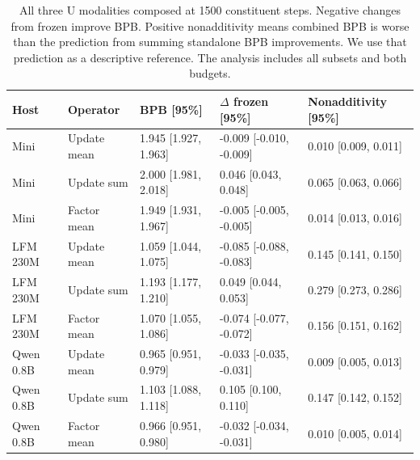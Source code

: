 \begin{table}[!htbp]\centering\small
\setlength{\tabcolsep}{4pt}
\caption{All three U modalities composed at 1500 constituent steps. Negative changes from frozen improve BPB. Positive nonadditivity means combined BPB is worse than the prediction from summing standalone BPB improvements. We use that prediction as a descriptive reference. The analysis includes all subsets and both budgets.}\label{tab:composition}
\begin{tabular}{@{}lllll@{}}
\toprule
Host & Operator & BPB [95\%] & $\Delta$ frozen [95\%] & Nonadditivity [95\%] \\
\midrule
Mini & Update mean & 1.945 [1.927, 1.963] & -0.009 [-0.010, -0.009] & 0.010 [0.009, 0.011] \\
Mini & Update sum & 2.000 [1.981, 2.018] & 0.046 [0.043, 0.048] & 0.065 [0.063, 0.066] \\
Mini & Factor mean & 1.949 [1.931, 1.967] & -0.005 [-0.005, -0.005] & 0.014 [0.013, 0.016] \\
LFM 230M & Update mean & 1.059 [1.044, 1.075] & -0.085 [-0.088, -0.083] & 0.145 [0.141, 0.150] \\
LFM 230M & Update sum & 1.193 [1.177, 1.210] & 0.049 [0.044, 0.053] & 0.279 [0.273, 0.286] \\
LFM 230M & Factor mean & 1.070 [1.055, 1.086] & -0.074 [-0.077, -0.072] & 0.156 [0.151, 0.162] \\
Qwen 0.8B & Update mean & 0.965 [0.951, 0.979] & -0.033 [-0.035, -0.031] & 0.009 [0.005, 0.013] \\
Qwen 0.8B & Update sum & 1.103 [1.088, 1.118] & 0.105 [0.100, 0.110] & 0.147 [0.142, 0.152] \\
Qwen 0.8B & Factor mean & 0.966 [0.951, 0.980] & -0.032 [-0.034, -0.031] & 0.010 [0.005, 0.014] \\
\bottomrule
\end{tabular}
\end{table}\par

